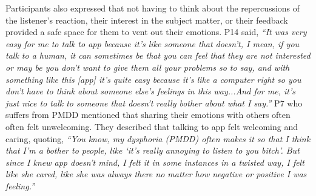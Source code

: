         
        Participants also expressed that not having to think about the repercussions of the listener's reaction, their interest in the subject matter, or their feedback provided a safe space for them to vent out their emotions. P14 said,
                \textit{
               ``It was very easy for me to talk to \acl{app} because it's like someone that doesn't, I mean, if you talk to a human, it can sometimes be that you can feel that they are not interested or may be you don't want to give them all your problems so to say, and with something like this [\acl{app}] it's quite easy because it's like a computer right so you don't have to think about someone else's feelings in this way...And for me, it's just nice to talk to someone that doesn't really bother about what I say.''
                } 
        P7 who suffers from \acl{PMDD} mentioned that sharing their emotions with others often often felt unwelcoming. 
        They described that talking to \acl{app} felt welcoming and caring, quoting,
                \textit{
                ``You know, my dysphoria (\acl{PMDD}) often makes it so that I think that I'm a bother to people, like `it's really annoying to listen to you bitch'. But since I knew \acl{app} doesn't mind, I felt it in some instances in a twisted way, I felt like she cared, like she was always there no matter how negative or positive I was feeling.''
                } 
        
